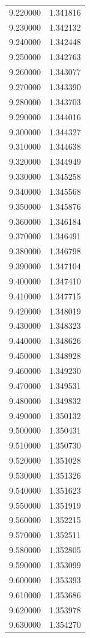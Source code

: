 \begin{tabular}{rr}
9.220000 & 1.341816 \\
9.230000 & 1.342132 \\
9.240000 & 1.342448 \\
9.250000 & 1.342763 \\
9.260000 & 1.343077 \\
9.270000 & 1.343390 \\
9.280000 & 1.343703 \\
9.290000 & 1.344016 \\
9.300000 & 1.344327 \\
9.310000 & 1.344638 \\
9.320000 & 1.344949 \\
9.330000 & 1.345258 \\
9.340000 & 1.345568 \\
9.350000 & 1.345876 \\
9.360000 & 1.346184 \\
9.370000 & 1.346491 \\
9.380000 & 1.346798 \\
9.390000 & 1.347104 \\
9.400000 & 1.347410 \\
9.410000 & 1.347715 \\
9.420000 & 1.348019 \\
9.430000 & 1.348323 \\
9.440000 & 1.348626 \\
9.450000 & 1.348928 \\
9.460000 & 1.349230 \\
9.470000 & 1.349531 \\
9.480000 & 1.349832 \\
9.490000 & 1.350132 \\
9.500000 & 1.350431 \\
9.510000 & 1.350730 \\
9.520000 & 1.351028 \\
9.530000 & 1.351326 \\
9.540000 & 1.351623 \\
9.550000 & 1.351919 \\
9.560000 & 1.352215 \\
9.570000 & 1.352511 \\
9.580000 & 1.352805 \\
9.590000 & 1.353099 \\
9.600000 & 1.353393 \\
9.610000 & 1.353686 \\
9.620000 & 1.353978 \\
9.630000 & 1.354270 \\

\end{tabular}
